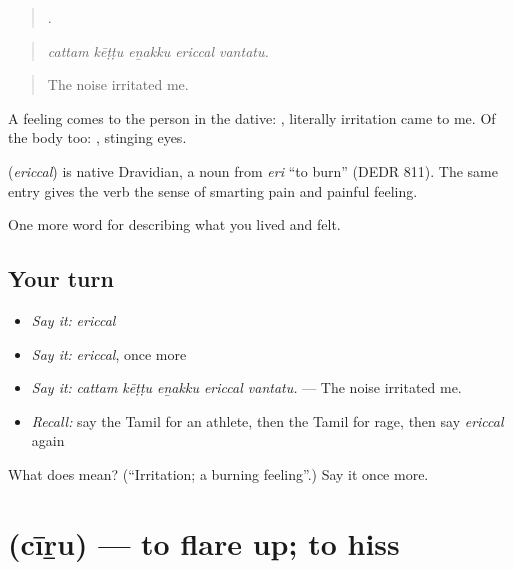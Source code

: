 \begin{quote}
    .
\end{quote}

\begin{quote}
\emph{cattam kēṭṭu eṉakku ericcal vantatu.}
\end{quote}

\begin{quote}
The noise irritated me.
\end{quote}

A feeling comes to the person in the dative:   , literally irritation came to me. Of the body too:  , stinging eyes.

\begin{cousinweb}
\textbf{} (\emph{ericcal}) is native Dravidian, a noun from  \emph{eri} \textquotedblleft{}to burn\textquotedblright{} (DEDR 811). The same entry gives the verb the sense of smarting pain and painful feeling.
\end{cousinweb}

\begin{grammarlens}[title={What you've built}]
One more word for describing what you lived and felt.
\end{grammarlens}

\subsection*{Your turn}
\begin{itemize}
\raggedright
  \item \emph{Say it:} \emph{ericcal}
  \item \emph{Say it:} \emph{ericcal}, once more
  \item \emph{Say it:} \emph{cattam kēṭṭu eṉakku ericcal vantatu.} — The noise irritated me.
  \item \emph{Recall:} say the Tamil for an athlete, then the Tamil for rage, then say \emph{ericcal} again
\end{itemize}

\begin{tcolorbox}[breakable,colback=teal!4,colframe=teal!35!black,title={Before you move on}]
What does  mean? (\textquotedblleft{}Irritation; a burning feeling\textquotedblright{}.) Say it once more.
\end{tcolorbox}
\section[\texorpdfstring{\ta{சீறு} (cīṟu)}{சீறு (cīṟu)}]{ (cīṟu) — to flare up; to hiss}

